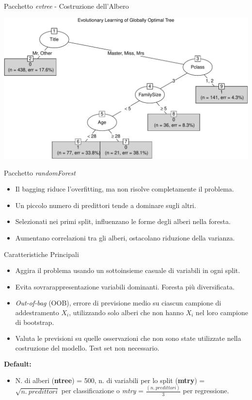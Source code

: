 \documentclass[9pt, xcolor=table]{beamer}
\begin{document}
	\begin{frame}{Pacchetto \textit{evtree} - Costruzione dell'Albero}
		
		
		\vfill
		
		\centering
		\includegraphics[scale=0.48]{evtree-tree}
	\end{frame}

	\begin{frame}{Pacchetto \textit{randomForest}}
		\begin{itemize}
			\item Il bagging riduce l'overfitting, ma non risolve completamente il problema.
			\item Un piccolo numero di predittori tende a dominare sugli altri.
			\item Selezionati nei primi split, influenzano le forme degli alberi nella foresta.
			\item Aumentano correlazioni tra gli alberi, ostacolano riduzione della varianza.
		\end{itemize}
	
		\begin{block}{Caratteristiche Principali}
			\begin{itemize}
				\item Aggira il problema usando un sottoinsieme casuale di variabili in ogni split.
				\item Evita sovrarappresentazione variabili dominanti. Foresta più diversificata.
				\item \textit{Out-of-bag} (OOB), errore di previsione medio su ciascun campione di addestramento $X_i$, utilizzando solo alberi che non hanno $X_i$ nel loro campione di bootstrap.
				\item Valuta le previsioni su quelle osservazioni che non sono state utilizzate nella costruzione del modello. Test set non necessario.
			\end{itemize}
		
			\textbf{Default:}
			
			\begin{itemize}
				\item N. di alberi (\textbf{ntree}) = 500, n. di variabili per lo split (\textbf{mtry}) = $\sqrt{n.\ predittori}$ per classificazione o \textit{mtry} = $\frac{(n.\ predittori)}{3}$ per regressione.
			\end{itemize}
		\end{block}
	\end{frame}
\end{document}
